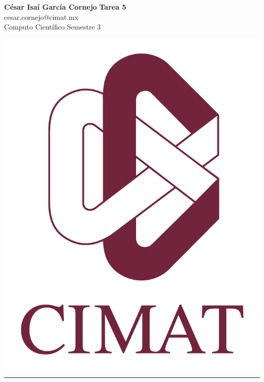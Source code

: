 \documentclass[a4paper, 11pt]{article}
\begin{document}
	\noindent
	
	\begin{minipage}[b][1.2cm][t]{0.8\textwidth}
		\large\textbf{César Isaí García Cornejo} \hfill \textbf{Tarea 5}  \\
		cesar.cornejo@cimat.mx \hfill \\
		\normalsize Computo Científico \hfill Semestre 3\\
	\end{minipage}
	
	\hspace{14.4cm}
	\begin{minipage}[b][0.03cm][t]{0.12\linewidth}
		
		\vspace{-2.2cm}
		\includegraphics[scale=0.3]{Figures/EscudoCimat.png}
	\end{minipage}
	
	\noindent\rule{7in}{2.8pt}
	
\end{document}
